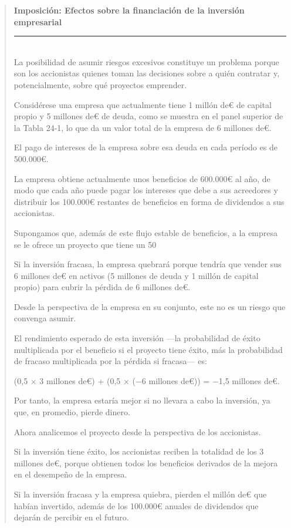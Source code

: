 \documentclass[10pt,a4paper]{article}
\newenvironment{specialblock}[1]{%
      \begin{quote} %
      \small %
      \noindent\textbf{#1}\\[-0.3em] %
      \rule{\linewidth}{0.4pt}\\[0.6em]}{
      \end{quote}}
\begin{document}
\begin{specialblock}{Imposición: Efectos sobre la financiación de la inversión empresarial}
    La posibilidad de asumir riesgos excesivos constituye un problema porque son los accionistas quienes toman las decisiones sobre a quién contratar y, potencialmente, sobre qué proyectos emprender.
    
    Considérese una empresa que actualmente tiene 1 millón de€ de capital propio y 5 millones de€ de deuda, como se muestra en el panel superior de la Tabla 24-1, lo que da un valor total de la empresa de 6 millones de€.
    
    El pago de intereses de la empresa sobre esa deuda en cada período es de 500.000€.
    
    La empresa obtiene actualmente unos beneficios de 600.000€ al año, de modo que cada año puede pagar los intereses que debe a sus acreedores y distribuir los 100.000€ restantes de beneficios en forma de dividendos a sus accionistas.
    
    Supongamos que, además de este flujo estable de beneficios, a la empresa se le ofrece un proyecto que tiene un 50 %
    
    Si la inversión fracasa, la empresa quebrará porque tendría que vender sus 6 millones de€ en activos (5 millones de deuda y 1 millón de capital propio) para cubrir la pérdida de 6 millones de€.
    
    Desde la perspectiva de la empresa en su conjunto, este no es un riesgo que convenga asumir.
    
    El rendimiento esperado de esta inversión —la probabilidad de éxito multiplicada por el beneficio si el proyecto tiene éxito, más la probabilidad de fracaso multiplicada por la pérdida si fracasa— es:
    
    (0,5 × 3 millones de€) + (0,5 × (−6 millones de€)) = −1,5 millones de€.
    
    Por tanto, la empresa estaría mejor si no llevara a cabo la inversión, ya que, en promedio, pierde dinero.
    
    Ahora analicemos el proyecto desde la perspectiva de los accionistas.
    
    Si la inversión tiene éxito, los accionistas reciben la totalidad de los 3 millones de€, porque obtienen todos los beneficios derivados de la mejora en el desempeño de la empresa.
    
    Si la inversión fracasa y la empresa quiebra, pierden el millón de€ que habían invertido, además de los 100.000€ anuales de dividendos que dejarán de percibir en el futuro.
    

\end{specialblock}
\end{document}
